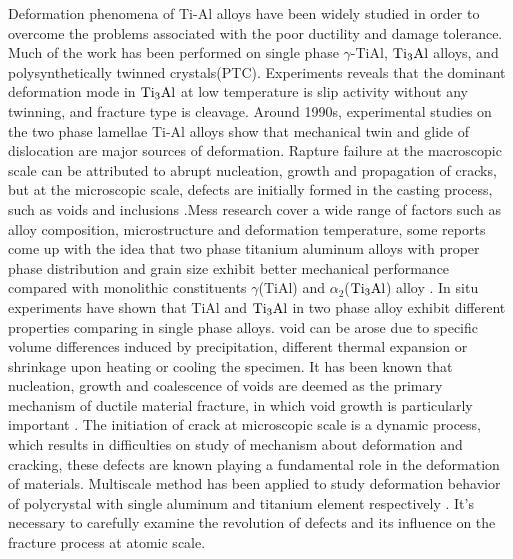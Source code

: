 \documentclass[materials,article,submit,moreauthors,pdftex,10pt,a4paper]{Definitions/mdpi}
\begin{document}
Deformation phenomena of Ti-Al alloys have been widely studied in order to overcome the problems associated with the poor ductility and damage tolerance.  Much of the work has been performed on single phase $\gamma$-TiAl, $\rm{Ti_3Al}$ alloys, and polysynthetically twinned crystals(PTC)\cite{Appel2016}. Experiments reveals that  the dominant deformation mode in $\rm{Ti_3Al}$ at low temperature is slip activity without any twinning, and fracture type is cleavage\cite{sastry1980plastic}. Around 1990s, experimental studies on the two phase lamellae Ti-Al alloys show that  mechanical twin and glide of  dislocation are major sources of deformation\cite{Farenc1993,Appel2005,Appel1998a}. Rapture failure at the macroscopic scale can be attributed to abrupt nucleation, growth and propagation of cracks, but at the microscopic scale, defects are initially formed in the casting process, such as voids and inclusions \cite{Tang2014}.Mess research  cover a wide range of factors such as alloy composition, microstructure and deformation temperature, some reports come up with the idea that two phase titanium aluminum alloys with proper phase distribution and grain size exhibit better mechanical performance compared with monolithic constituents $\gamma$(TiAl) and $\alpha_2$($\rm Ti_3Al$) alloy \cite{Kim1995}. In situ experiments have shown that TiAl and $\rm{Ti_3Al}$ in two phase alloy exhibit different properties comparing in single phase alloys\cite{Singh2006}. void can be arose due to specific volume differences induced by precipitation, different thermal expansion or shrinkage upon heating or cooling the specimen. It has been known that nucleation, growth and coalescence of voids are deemed as the primary mechanism of ductile material fracture, in which void growth is particularly important \cite{Hempel2017a}. The initiation of crack at microscopic scale is a dynamic process, which results in difficulties on study of  mechanism about deformation and cracking, these defects are known playing a fundamental role in the deformation of materials. Multiscale method has been applied to study deformation behavior of polycrystal with single aluminum \cite{Groh2009} and titanium element respectively \cite{Liu2018}. It's necessary to carefully examine the revolution of defects and its influence on the fracture process at atomic scale. 
\end{document}
